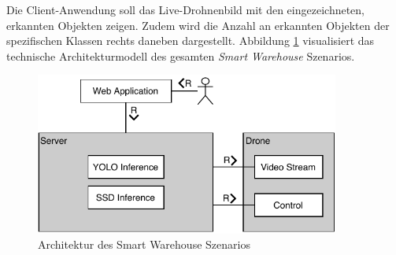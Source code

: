 Die Client-Anwendung soll das Live-Drohnenbild mit den eingezeichneten, erkannten Objekten zeigen. Zudem wird die Anzahl an erkannten Objekten der spezifischen Klassen rechts daneben dargestellt. Abbildung \ref{tam} visualisiert das technische Architekturmodell des gesamten \textit{Smart Warehouse} Szenarios.

\begin{figure}[H]
	\begin{center}
		\includegraphics[width=10cm]{Bilder/tam.pdf}
		\caption[Architektur des Smart Warehouse Szenarios]{Architektur des Smart Warehouse Szenarios}
		\label{tam}
	\end{center}
\end{figure}